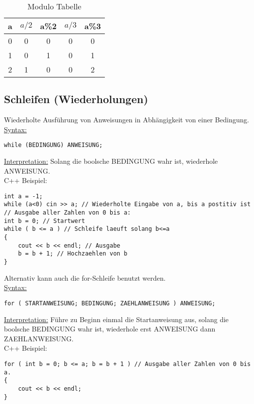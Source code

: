 \begin{table}[h]
	\caption[ModuloTabelle]{Modulo Tabelle}
	\begin{center}
	\begin{tabular}{c|c|c|c|c}
		a & $a/2$ & a\%2 & $a/3$ & a\%3 \\
		\hline
		0 & 0 & 0 & 0 & 0\\
		1 & 0 & 1 & 0 & 1 \\
		2 & 1 & 0 & 0 & 2 \\
	\end{tabular}
	\end{center}
\end{table}

\subsection{Schleifen (Wiederholungen)}
Wiederholte Ausführung von Anweisungen in Abhängigkeit von einer Bedingung. \\
\underline{Syntax:}
\begin{lstlisting}
while (BEDINGUNG) ANWEISUNG;
\end{lstlisting}
\underline{Interpretation:} Solang die boolsche BEDINGUNG wahr ist, wiederhole ANWEISUNG. \\
C++ Beispiel:
\begin{lstlisting}
int a = -1;
while (a<0) cin >> a; // Wiederholte Eingabe von a, bis a postitiv ist
// Ausgabe aller Zahlen von 0 bis a:
int b = 0; // Startwert
while ( b <= a ) // Schleife laeuft solang b<=a
{
	cout << b << endl; // Ausgabe
	b = b + 1; // Hochzaehlen von b
}
\end{lstlisting}
Alternativ kann auch die for-Schleife benutzt werden. \\
\underline{Syntax:}
\begin{lstlisting}
for ( STARTANWEISUNG; BEDINGUNG; ZAEHLANWEISUNG ) ANWEISUNG;
\end{lstlisting}
\underline{Interpretation:} Führe zu Beginn einmal die Startanweisung aus, solang die boolsche BEDINGUNG wahr ist, wiederhole erst ANWEISUNG dann ZAEHLANWEISUNG. \\
\newpage
C++ Beispiel:
\begin{lstlisting}
for ( int b = 0; b <= a; b = b + 1 ) // Ausgabe aller Zahlen von 0 bis a.
{
	cout << b << endl;
}
\end{lstlisting}

